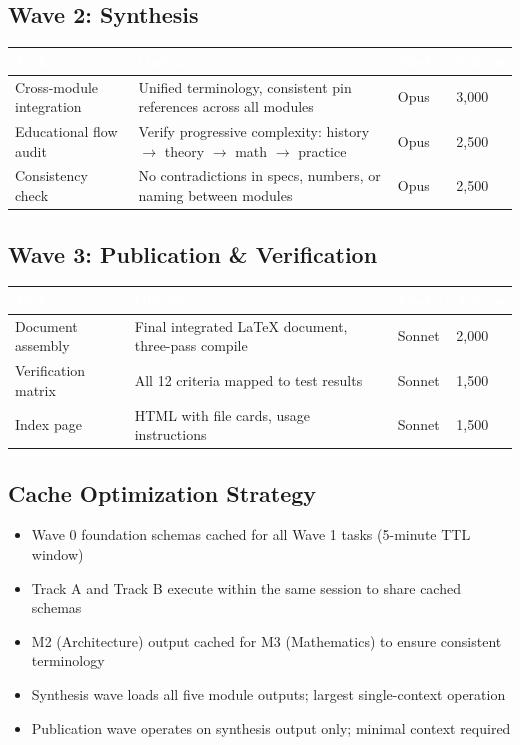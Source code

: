\documentclass[11pt,letterpaper]{article}
\newcommand{\tableheader}[1]{\textbf{\sffamily\textcolor{white}{#1}}}
\begin{document}
\subsection{Wave 2: Synthesis}

\begin{center}
\begin{tabularx}{\textwidth}{L{3cm}XC{1.5cm}C{1.5cm}}
\toprule
{}
\tableheader{Task} & \tableheader{Output} & \tableheader{Model} & \tableheader{Tokens} \\
\midrule
Cross-module integration & Unified terminology, consistent pin references across all modules & Opus & 3,000 \\
Educational flow audit & Verify progressive complexity: history $\rightarrow$ theory $\rightarrow$ math $\rightarrow$ practice & Opus & 2,500 \\
Consistency check & No contradictions in specs, numbers, or naming between modules & Opus & 2,500 \\
\bottomrule
\end{tabularx}
\end{center}

\subsection{Wave 3: Publication \& Verification}

\begin{center}
\begin{tabularx}{\textwidth}{L{3cm}XC{1.5cm}C{1.5cm}}
\toprule
{}
\tableheader{Task} & \tableheader{Output} & \tableheader{Model} & \tableheader{Tokens} \\
\midrule
Document assembly & Final integrated LaTeX document, three-pass compile & Sonnet & 2,000 \\
Verification matrix & All 12 criteria mapped to test results & Sonnet & 1,500 \\
Index page & HTML with file cards, usage instructions & Sonnet & 1,500 \\
\bottomrule
\end{tabularx}
\end{center}

\subsection{Cache Optimization Strategy}

\begin{itemize}[leftmargin=2em]
  \item Wave 0 foundation schemas cached for all Wave 1 tasks (5-minute TTL window)
  \item Track A and Track B execute within the same session to share cached schemas
  \item M2 (Architecture) output cached for M3 (Mathematics) to ensure consistent terminology
  \item Synthesis wave loads all five module outputs; largest single-context operation
  \item Publication wave operates on synthesis output only; minimal context required
\end{itemize}
\end{document}
